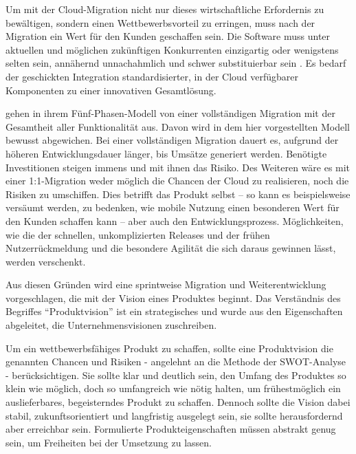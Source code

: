 Um mit der Cloud-Migration nicht nur dieses wirtschaftliche Erfordernis zu bewältigen, sondern 
einen Wettbewerbsvorteil zu erringen, muss nach der Migration ein Wert für den 
Kunden geschaffen sein. Die Software muss unter aktuellen und möglichen 
zukünftigen Konkurrenten einzigartig oder wenigstens selten sein, annähernd 
unnachahmlich und schwer substituierbar sein 
.
Es bedarf der geschickten Integration standardisierter, in der Cloud 
verfügbarer Komponenten zu einer innovativen Gesamtlösung. 

 gehen in ihrem Fünf-Phasen-Modell von einer vollständigen 
Migration mit der Gesamtheit aller Funktionalität aus. Davon wird in dem hier 
vorgestellten Modell bewusst abgewichen. Bei einer vollständigen Migration 
dauert es, aufgrund der höheren Entwicklungsdauer länger, bis Umsätze generiert 
werden. Benötigte Investitionen steigen immens und mit ihnen das Risiko. Des 
Weiteren wäre es mit einer 1:1-Migration weder möglich die Chancen der 
Cloud zu realisieren, noch die Risiken zu umschiffen. Dies betrifft das 
Produkt selbst -- so kann es beispielsweise versäumt werden, zu bedenken, wie 
mobile Nutzung einen besonderen Wert für den Kunden schaffen kann -- aber auch 
den Entwicklungsprozess. Möglichkeiten, wie die der schnellen, unkomplizierten 
Releases und der frühen Nutzerrückmeldung und die besondere Agilität die sich 
daraus gewinnen lässt, werden verschenkt.

Aus diesen Gründen wird eine sprintweise Migration und 
Weiterentwicklung vorgeschlagen, die mit der Vision eines Produktes beginnt. 
Das Verständnis des Begriffes "`Produktvision"' ist ein strategisches und wurde 
aus den Eigenschaften abgeleitet, die  
Unternehmensvisionen zuschreiben.

Um ein wettbewerbsfähiges Produkt zu schaffen, sollte eine Produktvision die genannten Chancen und Risiken - angelehnt an die Methode der SWOT-Analyse %
 - berücksichtigen. 
Sie sollte klar und deutlich sein, den Umfang des Produktes so klein wie möglich, doch so umfangreich wie nötig halten, 
um frühestmöglich ein auslieferbares, begeisterndes Produkt zu schaffen. Dennoch sollte die Vision dabei stabil, 
zukunftsorientiert und langfristig ausgelegt sein, sie sollte herausfordernd aber erreichbar sein. Formulierte Produkteigenschaften müssen abstrakt genug sein, um Freiheiten bei der Umsetzung zu lassen. 

